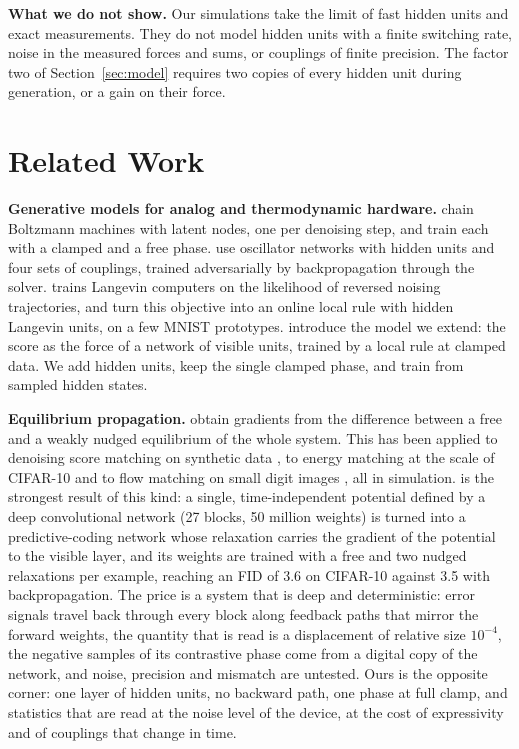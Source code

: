 \documentclass{article}
\newif\ifshownotes
\newcommand{\budget}[1]{\ifshownotes{\noindent\small\itshape\textcolor{notegray}{[Budget: #1]}\par}\fi}
\newcommand{\todo}[1]{\ifshownotes\textcolor{tbdcolor}{[TODO: #1]}\fi}
\begin{document}
\textbf{What we do not show.}
Our simulations take the limit of fast hidden units and exact measurements.
They do not model hidden units with a finite switching rate, noise in the
measured forces and sums, or couplings of finite precision. The factor two of
Section~\ref{sec:model} requires two copies of every hidden unit during
generation, or a gain on their force.

\section{Related Work}
\label{sec:related}
\budget{0.8 page; this section cannot be cut}

\textbf{Generative models for analog and thermodynamic hardware.}
\citet{jelincic2025dtm} chain Boltzmann machines with latent nodes, one per
denoising step, and train each with a clamped and a free phase.
\citet{wangachour2026} use oscillator networks with hidden units and four
sets of couplings, trained adversarially by backpropagation through the
solver. \citet{whitelam2025generative} trains Langevin computers on the
likelihood of reversed noising trajectories, and \citet{wangdeng2026online}
turn this objective into an online local rule with hidden Langevin units, on
a few MNIST prototypes. \citet{firstpaper2025} introduce the model we extend:
the score as the force of a network of visible units, trained by a local rule
at clamped data. We add hidden units, keep the single clamped phase, and
train from sampled hidden states.

\textbf{Equilibrium propagation.}
\citet{scellier2017equilibrium} obtain gradients from the difference between
a free and a weakly nudged equilibrium of the whole system. This has been
applied to denoising score matching on synthetic data
\citep{de2026symmetric}, to energy matching at the scale of CIFAR-10
\citep{gower2026potentialep} and to flow matching on small digit images
\citep{gower2026floweqprop}, all in simulation.
\citet{gower2026potentialep} is the strongest result of this kind: a single,
time-independent potential defined by a deep convolutional network (27
blocks, 50 million weights) is turned into a predictive-coding network whose
relaxation carries the gradient of the potential to the visible layer, and
its weights are trained with a free and two nudged relaxations per example,
reaching an FID of 3.6 on CIFAR-10 against 3.5 with backpropagation. The
price is a system that is deep and deterministic: error signals travel back
through every block along feedback paths that mirror the forward weights, the
quantity that is read is a displacement of relative size $10^{-4}$, the
negative samples of its contrastive phase come from a digital copy of the
network, and noise, precision and mismatch are untested. Ours is the opposite
corner: one layer of hidden units, no backward path, one phase at full clamp,
and statistics that are read at the noise level of the device, at the cost of
expressivity and of couplings that change in time.
\todo{checked against the main text of the paper (v2); the appendices only
through a summary.}
\end{document}
